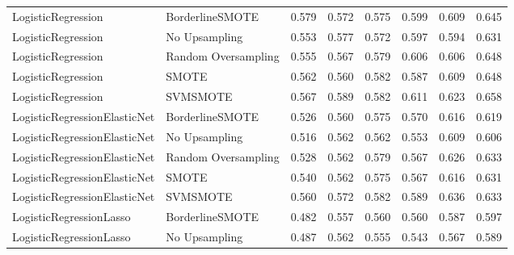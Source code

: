 \begin{tabular}{llllllll}
          LogisticRegression &     BorderlineSMOTE & 0.579 &                     0.572 &                 0.575 &                  0.599 &                                   0.609 &    0.645 \\
          LogisticRegression &       No Upsampling & 0.553 &                     0.577 &                 0.572 &                  0.597 &                                   0.594 &    0.631 \\
          LogisticRegression & Random Oversampling & 0.555 &                     0.567 &                 0.579 &                  0.606 &                                   0.606 &    0.648 \\
          LogisticRegression &               SMOTE & 0.562 &                     0.560 &                 0.582 &                  0.587 &                                   0.609 &    0.648 \\
          LogisticRegression &            SVMSMOTE & 0.567 &                     0.589 &                 0.582 &                  0.611 &                                   0.623 &    0.658 \\
LogisticRegressionElasticNet &     BorderlineSMOTE & 0.526 &                     0.560 &                 0.575 &                  0.570 &                                   0.616 &    0.619 \\
LogisticRegressionElasticNet &       No Upsampling & 0.516 &                     0.562 &                 0.562 &                  0.553 &                                   0.609 &    0.606 \\
LogisticRegressionElasticNet & Random Oversampling & 0.528 &                     0.562 &                 0.579 &                  0.567 &                                   0.626 &    0.633 \\
LogisticRegressionElasticNet &               SMOTE & 0.540 &                     0.562 &                 0.575 &                  0.567 &                                   0.616 &    0.631 \\
LogisticRegressionElasticNet &            SVMSMOTE & 0.560 &                     0.572 &                 0.582 &                  0.589 &                                   0.636 &    0.633 \\
     LogisticRegressionLasso &     BorderlineSMOTE & 0.482 &                     0.557 &                 0.560 &                  0.560 &                                   0.587 &    0.597 \\
     LogisticRegressionLasso &       No Upsampling & 0.487 &                     0.562 &                 0.555 &                  0.543 &                                   0.567 &    0.589 \\

\end{tabular}
